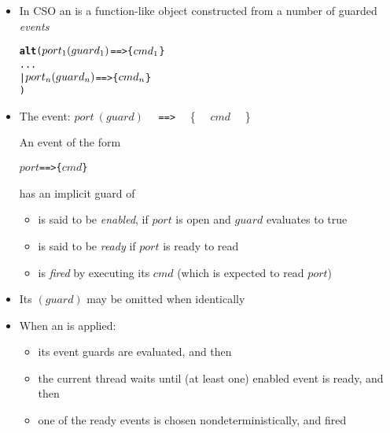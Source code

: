 \documentclass{concdistfoils}
\begin{document}
\begin{slide}
\begin{itemize}
\item In CSO an  is a function-like object constructed from a number of guarded \textit{events}
\begin{alltt}
        \textsf{\textbf{alt}} ( \(port\sb1 (guard\sb1)\) \texttt{==>} \{ \(cmd\sb1\) \}
             ...
           | \(port\sb{n} (guard\sb{n})\) \texttt{==>} \{ \(cmd\sb{n}\) \}
           )
\end{alltt}
\vfill
\item The event: \(port ~(guard)\) ~~\verb/==>/~~ \{ ~~\(cmd\)~~ \}
\begin{note}
An event of the form
\begin{alltt}
        \(port \)       \texttt{==>} \{ \(cmd\) \}
\end{alltt}
has an implicit guard of 
\end{note}
\begin{itemize}
\item is said to be \textit{enabled}, if $port$ is open and $guard$ evaluates to true
\item is said to be \textit{ready} if $port$ is ready to read
\item is \textit{fired} by executing its $cmd$ (which is expected to read $port$)
\end{itemize}
\vfill
\item Its $(guard)$ may be omitted when identically 
\vfill
\item When an  is applied:
\begin{itemize}
\item its event guards are evaluated, and then
\item the current thread waits until (at least one) enabled event is ready, and then
\item one of the ready events is chosen nondeterministically, and fired
\end{itemize}
\end{itemize}
\end{slide}
\end{document}

